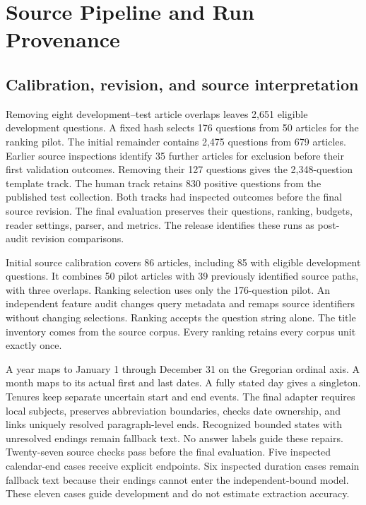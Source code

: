 \section{Source Pipeline and Run Provenance}
\label{app:pipeline}

\subsection{Calibration, revision, and source interpretation}
Removing eight development--test article overlaps leaves 2,651 eligible development questions.
A fixed hash selects 176 questions from 50 articles for the ranking pilot.
The initial remainder contains 2,475 questions from 679 articles.
Earlier source inspections identify 35 further articles for exclusion before their first validation outcomes.
Removing their 127 questions gives the 2,348-question template track.
The human track retains 830 positive questions from the published test collection.
Both tracks had inspected outcomes before the final source revision.
The final evaluation preserves their questions, ranking, budgets, reader settings, parser, and metrics.
The release identifies these runs as post-audit revision comparisons.

Initial source calibration covers 86 articles, including 85 with eligible development questions.
It combines 50 pilot articles with 39 previously identified source paths, with three overlaps.
Ranking selection uses only the 176-question pilot.
An independent feature audit changes query metadata and remaps source identifiers without changing selections.
Ranking accepts the question string alone.
The title inventory comes from the source corpus.
Every ranking retains every corpus unit exactly once.

A year maps to January 1 through December 31 on the Gregorian ordinal axis.
A month maps to its actual first and last dates.
A fully stated day gives a singleton.
Tenures keep separate uncertain start and end events.
The final adapter requires local subjects, preserves abbreviation boundaries, checks date ownership, and links uniquely resolved paragraph-level ends.
Recognized bounded states with unresolved endings remain fallback text.
No answer labels guide these repairs.
Twenty-seven source checks pass before the final evaluation.
Five inspected calendar-end cases receive explicit endpoints.
Six inspected duration cases remain fallback text because their endings cannot enter the independent-bound model.
These eleven cases guide development and do not estimate extraction accuracy.

